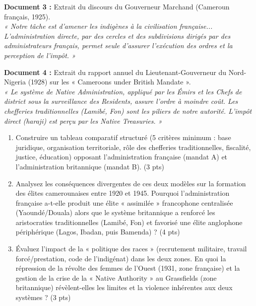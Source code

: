 \documentclass[11pt]{article}
\begin{document}
\begin{exercice}
\textbf{Document 3 :} Extrait du discours du Gouverneur Marchand (Cameroun français, 1925). \\
\textit{« Notre tâche est d'amener les indigènes à la civilisation française... L'administration directe, par des cercles et des subdivisions dirigés par des administrateurs français, permet seule d'assurer l'exécution des ordres et la perception de l'impôt. »}

\textbf{Document 4 :} Extrait du rapport annuel du Lieutenant-Gouverneur du Nord-Nigeria (1928) sur les « Cameroons under British Mandate ». \\
\textit{« Le système de Native Administration, appliqué par les Émirs et les Chefs de district sous la surveillance des Residents, assure l'ordre à moindre coût. Les chefferies traditionnelles (Lamibé, Fon) sont les piliers de notre autorité. L'impôt direct (haraji) est perçu par les Native Treasuries. »}

\begin{enumerate}
    \item Construire un tableau comparatif structuré (5 critères minimum : base juridique, organisation territoriale, rôle des chefferies traditionnelles, fiscalité, justice, éducation) opposant l'administration française (mandat A) et l'administration britannique (mandat B). (3 pts)
    \item Analysez les conséquences divergentes de ces deux modèles sur la formation des élites camerounaises entre 1920 et 1945. Pourquoi l'administration française a-t-elle produit une élite « assimilée » francophone centralisée (Yaoundé/Douala) alors que le système britannique a renforcé les aristocraties traditionnelles (Lamibé, Fon) et favorisé une élite anglophone périphérique (Lagos, Ibadan, puis Bamenda) ? (4 pts)
    \item Évaluez l'impact de la « politique des races » (recrutement militaire, travail forcé/prestation, code de l'indigénat) dans les deux zones. En quoi la répression de la révolte des femmes de l'Ouest (1931, zone française) et la gestion de la crise de la « Native Authority » au Grassfields (zone britannique) révèlent-elles les limites et la violence inhérentes aux deux systèmes ? (3 pts)
\end{enumerate}
\end{exercice}
\end{document}
